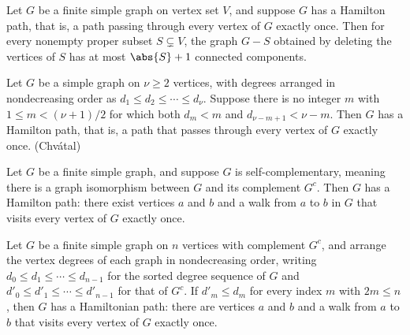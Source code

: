 \begin{theorem}
\label{SimpleGraph.hamiltonian_path_toughness}
Let $G$ be a finite simple graph on vertex set $V$, and suppose $G$ has a Hamilton path,
that is, a path passing through every vertex of $G$ exactly once. Then for every
nonempty proper subset $S \subsetneq V$, the graph $G - S$ obtained by deleting the
vertices of $S$ has at most $\abs{S} + 1$ connected components.
\end{theorem}

\begin{theorem}
\label{SimpleGraph.chvatal_hamiltonian_path}
Let $G$ be a simple graph on $\nu \ge 2$ vertices, with degrees arranged in
nondecreasing order as $d_1 \le d_2 \le \cdots \le d_\nu$. Suppose there is no integer
$m$ with $1 \le m < (\nu+1)/2$ for which both $d_m < m$ and $d_{\nu-m+1} < \nu - m$.
Then $G$ has a Hamilton path, that is, a path that passes through every vertex of $G$
exactly once. (Chvátal)
\end{theorem}

\begin{theorem}
\label{SimpleGraph.hamiltonian_path_of_self_complementary}
Let $G$ be a finite simple graph, and suppose $G$ is self-complementary, meaning there
is a graph isomorphism between $G$ and its complement $G^c$. Then $G$ has a Hamilton
path: there exist vertices $a$ and $b$ and a walk from $a$ to $b$ in $G$ that visits
every vertex of $G$ exactly once.
\end{theorem}

\begin{theorem}
\label{SimpleGraph.hamiltonian_path_of_degree_dominates_compl}
Let $G$ be a finite simple graph on $n$ vertices with complement $G^{c}$, and arrange
the vertex degrees of each graph in nondecreasing order, writing $d_{0} \le d_{1} \le
\cdots \le d_{n-1}$ for the sorted degree sequence of $G$ and $d'_{0} \le d'_{1} \le
\cdots \le d'_{n-1}$ for that of $G^{c}$. If $d'_{m} \le d_{m}$ for every index $m$ with
$2m \le n$, then $G$ has a Hamiltonian path: there are vertices $a$ and $b$ and a walk
from $a$ to $b$ that visits every vertex of $G$ exactly once.
\end{theorem}

